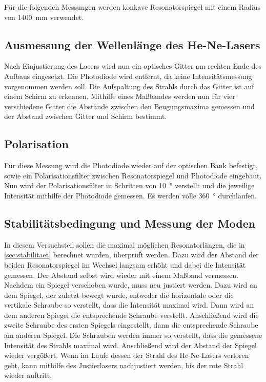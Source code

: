     Für die folgenden Messungen werden konkave Resonatorspiegel mit einem Radius von \SI{1400}{\milli\meter} verwendet.


\subsection{Ausmessung der Wellenlänge des He-Ne-Lasers}

    Nach Einjustierung des Lasers wird nun ein optisches Gitter am rechten Ende des Aufbaus eingesetzt.
    Die Photodiode wird entfernt, da keine Intensitätsmessung vorgenommen werden soll.
    Die Aufspaltung des Strahls durch das Gitter ist auf einem Schirm zu erkennen.
    Mithilfe eines Maßbandes werden nun für vier verschiedene Gitter die Abstände zwischen den Beugungsmaxima gemessen
    und der Abstand zwischen Gitter und Schirm bestimmt.


\subsection{Polarisation}

    Für diese Messung wird die Photodiode wieder auf der optischen Bank befestigt,
    sowie ein Polarisationsfilter zwischen Resonatorspiegel und Photodiode eingebaut.
    Nun wird der Polarisationsfilter in Schritten von \SI{10}{\degree} verstellt und die jeweilige Intensität mithilfe der Photodiode gemessen.
    Es werden volle \SI{360}{\degree} durchlaufen.


\subsection{Stabilitätsbedingung und Messung der Moden}

    In diesem Versuchsteil sollen die maximal möglichen Resonatorlängen,
    die in \autoref{sec:stabilitaet} berechnet wurden,
    überprüft werden.
    Dazu wird der Abstand der beiden Resonatorspiegel im Wechsel langsam erhöht und dabei die Intensität gemessen.
    Der Abstand selbst wird wieder mit einem Maßband vermessen.
    Nachdem ein Spiegel verschoben wurde,
    muss neu justiert werden.
    Dazu wird an dem Spiegel,
    der zuletzt bewegt wurde,
    entweder die horizontale oder die vertikale Schraube so verstellt,
    dass die Intensität maximal wird.
    Dann wird an dem anderen Spiegel die entsprechende Schraube verstellt.
    Anschließend wird die zweite Schraube des ersten Spiegels eingestellt,
    dann die entsprechende Schraube am anderen Spiegel.
    Die Schrauben werden immer so verstellt,
    dass die gemessene Intensität des Strahls maximal wird.
    Anschließend wird der Abstand der Spiegel wieder vergößert.
    Wenn im Laufe dessen der Strahl des He-Ne-Lasers verloren geht,
    kann mithilfe des Justierlasers nachjustiert werden,
    bis der rote Strahl wieder auftritt.

